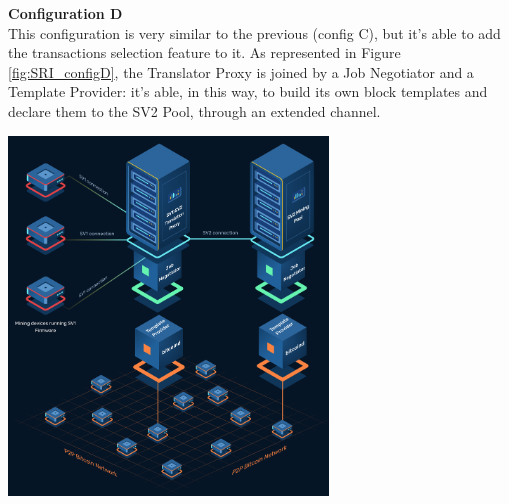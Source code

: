 \begin{itemize}
    \begin{minipage}{.40\textwidth}
    \item \textbf{Configuration D}\label{configD}\\
    This configuration is very similar to the previous (config C), but it's able to add the transactions selection feature to it. As represented in Figure \ref{fig:SRI_configD}, the Translator Proxy is joined by a Job Negotiator and a Template Provider: it's able, in this way, to build its own block templates and declare them to the SV2 Pool, through an extended channel.
    \end{minipage}
    \hspace{0.25cm}
    \begin{minipage}{.60\textwidth}
    \includegraphics[width=8.5cm]{Figures/sri/SRI_configD.png} 
    \label{fig:SRI_configD}
    \end{minipage}
    
\end{itemize}